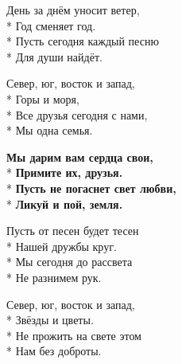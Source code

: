 \medskip

\begin{minipage}{\linewidth}
День за днём уносит ветер,\\*
Год сменяет год.\\*
Пусть сегодня каждый песню\\*
Для души найдёт.\\
\end{minipage}\par\medskip\nobreak

\medskip

\begin{minipage}{\linewidth}
Север, юг, восток и запад,\\*
Горы и моря,\\*
Все друзья сегодня с нами,\\*
Мы одна семья.\\
\end{minipage}\par\medskip\nobreak

\medskip

\begin{minipage}{\linewidth}
\hspace*{1.5em}\textbf{Мы дарим вам сердца свои,}\\*
\hspace*{1.5em}\textbf{Примите их, друзья.}\\*
\hspace*{1.5em}\textbf{Пусть не погаснет свет любви,}\\*
\hspace*{1.5em}\textbf{Ликуй и пой, земля.}\\
\end{minipage}\par\medskip\nobreak

\medskip

\begin{minipage}{\linewidth}
Пусть от песен будет тесен\\*
Нашей дружбы круг.\\*
Мы сегодня до рассвета\\*
Не разнимем рук.\\
\end{minipage}\par\medskip\nobreak

\medskip

\begin{minipage}{\linewidth}
Север, юг, восток и запад,\\*
Звёзды и цветы.\\*
Не прожить на свете этом\\*
Нам без доброты.\\
\end{minipage}\par\medskip\nobreak

